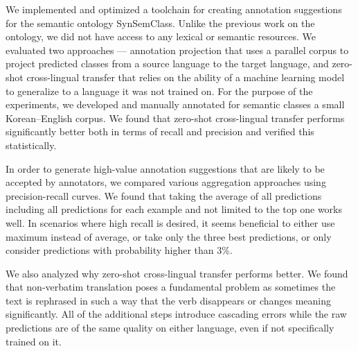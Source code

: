 

We implemented and optimized a toolchain for creating annotation suggestions for the semantic ontology SynSemClass. Unlike the previous work on the ontology, we did not have access to any lexical or semantic resources. We evaluated two approaches --- annotation projection that uses a parallel corpus to project predicted classes from a source language to the target language, and zero-shot cross-lingual transfer that relies on the ability of a machine learning model to generalize to a language it was not trained on. For the purpose of the experiments, we developed and manually annotated for semantic classes a small Korean--English corpus. We found that zero-shot cross-lingual transfer performs significantly better both in terms of recall and precision and verified this statistically.

In order to generate high-value annotation suggestions that are likely to be accepted by annotators, we compared various aggregation approaches using precision-recall curves. We found that taking the average of all predictions including all predictions for each example and not limited to the top one works well. In scenarios where high recall is desired, it seems beneficial to either use maximum instead of average, or take only the three best predictions, or only consider predictions with probability higher than 3\%.

We also analyzed why zero-shot cross-lingual transfer performs better. We found that non-verbatim translation poses a fundamental problem as sometimes the text is rephrased in such a way that the verb disappears or changes meaning significantly. All of the additional steps introduce cascading errors while the raw predictions are of the same quality on either language, even if not specifically trained on it.